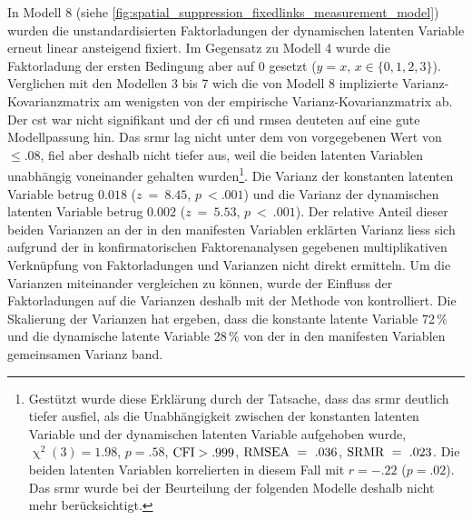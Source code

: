 \documentclass[11pt, twoside, a4paper]{book}		%
\begin{document}
In Modell 8 (siehe \autoref{fig:spatial_suppression_fixedlinks_measurement_model}) wurden die unstandardisierten Faktorladungen der dynamischen latenten Variable erneut linear ansteigend fixiert.
Im Gegensatz zu Modell 4 wurde die Faktorladung der ersten Bedingung aber auf 0 gesetzt ($y=x,\,x\in\{0, 1, 2, 3\}$).
Verglichen mit den Modellen 3 bis 7 wich die von Modell 8 implizierte Var\-ianz-Ko\-var\-ianz\-ma\-trix am wenigsten von der empirische Var\-ianz-Ko\-var\-ianz\-ma\-trix ab. Der \gls{cst} war nicht signifikant und der \gls{cfi} und \gls{rmsea} deuteten auf eine gute Modellpassung hin. 
Das \gls{srmr}  lag nicht unter dem von \citet{Hu1999} vorgegebenen Wert von $\leq.08$, fiel aber deshalb  nicht tiefer aus, weil die beiden latenten Variablen unabhängig voneinander gehalten wurden\footnote{Gestützt wurde diese Erklärung durch der Tatsache, dass das \gls{srmr} deutlich tiefer ausfiel, als die Unabhängigkeit zwischen der konstanten latenten Variable und der dynamischen latenten Variable aufgehoben wurde, $\upchi^2(3)=1.98$, $p=.58$, $\textnormal{CFI}>.999$, $\textnormal{RMSEA}~=~.036$, $\textnormal{SRMR}~=~.023$. Die beiden latenten Variablen korrelierten in diesem Fall mit $r=-.22$ ($p=.02$). Das \gls{srmr} wurde bei der Beurteilung der folgenden Modelle deshalb nicht mehr berücksichtigt.}. 
Die Varianz der konstanten latenten Variable betrug $0.018$ ($z~=~8.45$, $p~<.001$) und die Varianz der dynamischen latenten Variable betrug $0.002$ ($z~=~5.53$, $p~<~.001$). 
Der relative Anteil dieser beiden Varianzen an der in den manifesten Variablen erklärten Varianz liess sich aufgrund der in konfirmatorischen Faktorenanalysen gegebenen multiplikativen Verknüpfung von Faktorladungen und Varianzen nicht direkt ermitteln. Um die Varianzen miteinander vergleichen zu können, wurde der Einfluss der Faktorladungen auf die Varianzen deshalb mit der Methode von  \citet{Schweizer2011a} kontrolliert. Die Skalierung der Varianzen hat ergeben, dass die konstante latente Variable 72\,\% und die dynamische latente Variable 28\,\% von der in den manifesten Variablen gemeinsamen Varianz band.
\end{document}
